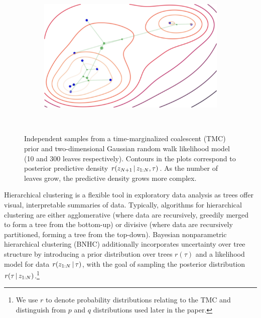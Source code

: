 \begin{figure}[t]
\centering
\begin{subfigure}[t]{0.4\textwidth}
    \centering
    \includegraphics[frame, width=\textwidth]{img/loracs/tmc/tmc-small-cropped}
\end{subfigure}
~
\begin{subfigure}[t]{0.4\textwidth}
    \centering
\end{subfigure}
\caption{Independent samples from a time-marginalized coalescent (TMC) prior and two-dimensional Gaussian random walk likelihood model (10 and 300 leaves respectively). 
Contours in the plots correspond to posterior predictive density $r(z_{N + 1} \,|\, z_{1:N}, \tau)$.
As the number of leaves grow, the predictive density grows more complex.}
\label{fig:tmc-samples}
\end{figure}

Hierarchical clustering is a flexible
tool in exploratory data analysis
as trees offer visual, interpretable
summaries of data. Typically,
algorithms for hierarchical clustering are
either agglomerative
(where data are recursively, greedily merged to form
a tree from the bottom-up)
or divisive (where data
are recursively partitioned, forming a tree from the
top-down). Bayesian nonparametric hierarchical clustering (BNHC) 
additionally incorporates uncertainty over tree
structure by introducing
a prior distribution over trees $r(\tau)$ and
a likelihood model for data $r(z_{1:N} \,|\, \tau)$,
with the goal of sampling
the posterior distribution $r(\tau \,|\, z_{1:N})$.\footnote{We use $r$ to denote probability distributions
relating to the TMC and distinguish from $p$ and $q$
distributions used later in the paper.}

